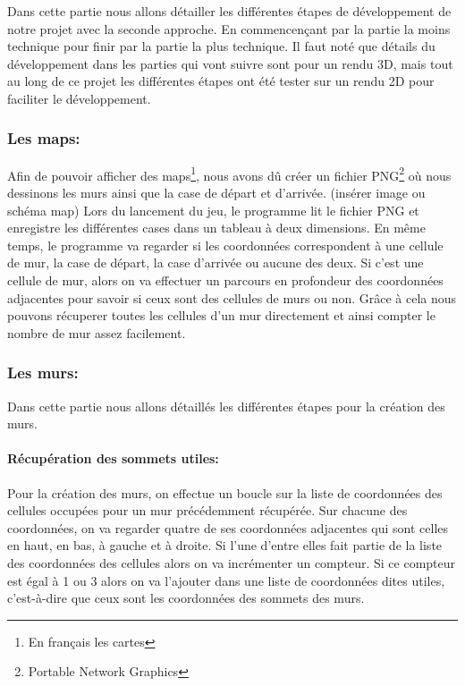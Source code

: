 \documentclass[12pt]{report}
\begin{document}
Dans cette partie nous allons détailler les différentes étapes de développement
de notre projet avec la seconde approche. En commencençant par la partie la 
moins technique pour finir par la partie la plus technique.
Il faut noté que détails du développement dans les parties qui vont suivre
sont pour un rendu 3D, mais tout au long de ce projet les différentes étapes
ont été tester sur un rendu 2D pour faciliter le développement.

\subsubsection{Les maps:}
Afin de pouvoir afficher des maps\footnote{En français les cartes}, 
nous avons dû créer un fichier PNG\footnote{Portable Network Graphics} où
nous dessinons les murs ainsi que la case de départ et d'arrivée. (insérer image ou schéma map)
Lors du lancement du jeu, le programme lit le fichier PNG et enregistre les
différentes cases dans un tableau à deux dimensions. En même temps, le programme
va regarder si les coordonnées correspondent à une cellule de mur, la case 
de départ, la case d'arrivée ou aucune des deux. Si c'est une cellule de mur, 
alors on va effectuer un parcours en profondeur des coordonnées adjacentes 
pour savoir si ceux sont des cellules de murs ou non. Grâce à cela nous 
pouvons récuperer toutes les cellules d'un mur directement et ainsi compter 
le nombre de mur assez facilement.

\subsubsection{Les murs:}

Dans cette partie nous allons détaillés les différentes étapes pour la création
des murs.

\paragraph{Récupération des sommets utiles:}

Pour la création des murs, on effectue un boucle sur la liste de coordonnées
des cellules occupées pour un mur précédemment récupérée. Sur chacune des 
coordonnées, on va regarder quatre de ses coordonnées adjacentes qui sont celles
en haut, en bas, à gauche et à droite. Si l'une d'entre elles fait partie de 
la liste des coordonnées des cellules alors on va incrémenter un compteur.
Si ce compteur est égal à 1 ou 3 alors on va l'ajouter dans une liste de coordonnées
dites utiles, c'est-à-dire que ceux sont les coordonnées des sommets des murs.
\end{document}
